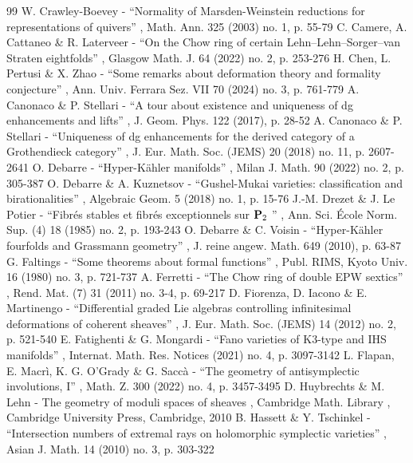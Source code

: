 \documentclass[11pt]{article}
\theoremstyle{definition}
\begin{document}
\begin{thebibliography}{99}
 W. Crawley-Boevey - “Normality of Marsden-Weinstein reductions for representations of quivers” , Math. Ann. 325 (2003) no. 1, p. 55-79
 C. Camere, A. Cattaneo \& R. Laterveer - “On the Chow ring of certain Lehn–Lehn–Sorger–van Straten eightfolds” , Glasgow Math. J. 64 (2022) no. 2, p. 253-276
 H. Chen, L. Pertusi \& X. Zhao - “Some remarks about deformation theory and formality conjecture” , Ann. Univ. Ferrara Sez. VII 70 (2024) no. 3, p. 761-779
 A. Canonaco \& P. Stellari - “A tour about existence and uniqueness of dg enhancements and lifts” , J. Geom. Phys. 122 (2017), p. 28-52
 A. Canonaco \& P. Stellari - “Uniqueness of dg enhancements for the derived category of a Grothendieck category” , J. Eur. Math. Soc. (JEMS) 20 (2018) no. 11, p. 2607-2641
 O. Debarre - “Hyper-Kähler manifolds” , Milan J. Math. 90 (2022) no. 2, p. 305-387
 O. Debarre \& A. Kuznetsov - “Gushel-Mukai varieties: classification and birationalities” , Algebraic Geom. 5 (2018) no. 1, p. 15-76
 J.-M. Drezet \& J. Le Potier - “Fibrés stables et fibrés exceptionnels sur ${\bf P}_2$ ” , Ann. Sci. École Norm. Sup. (4) 18 (1985) no. 2, p. 193-243
 O. Debarre \& C. Voisin - “Hyper-Kähler fourfolds and Grassmann geometry” , J. reine angew. Math. 649 (2010), p. 63-87
 G. Faltings - “Some theorems about formal functions” , Publ. RIMS, Kyoto Univ. 16 (1980) no. 3, p. 721-737
 A. Ferretti - “The Chow ring of double EPW sextics” , Rend. Mat. (7) 31 (2011) no. 3-4, p. 69-217
 D. Fiorenza, D. Iacono \& E. Martinengo - “Differential graded Lie algebras controlling infinitesimal deformations of coherent sheaves” , J. Eur. Math. Soc. (JEMS) 14 (2012) no. 2, p. 521-540
 E. Fatighenti \& G. Mongardi - “Fano varieties of K3-type and IHS manifolds” , Internat. Math. Res. Notices (2021) no. 4, p. 3097-3142
 L. Flapan, E. Macrì, K. G. O’Grady \& G. Saccà - “The geometry of antisymplectic involutions, I” , Math. Z. 300 (2022) no. 4, p. 3457-3495
 D. Huybrechts \& M. Lehn - The geometry of moduli spaces of sheaves , Cambridge Math. Library , Cambridge University Press, Cambridge, 2010
 B. Hassett \& Y. Tschinkel - “Intersection numbers of extremal rays on holomorphic symplectic varieties” , Asian J. Math. 14 (2010) no. 3, p. 303-322

\end{thebibliography}
\end{document}

